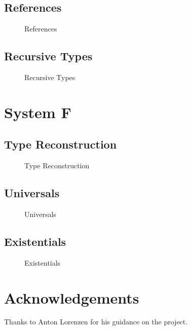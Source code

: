 \documentclass[nonacm]{acmart}
\begin{document}
\subsection{References}

\begin{figure}
  \begin{framed}
  \end{framed}
  \caption{References}\label{fig:references}
\end{figure}

\subsection{Recursive Types}

\begin{figure}
  \begin{framed}
  \end{framed}
  \caption{Recursive Types}\label{fig:recursive-types}
\end{figure}

\section{System F}

\subsection{Type Reconstruction}

\begin{figure}
  \begin{framed}
  \end{framed}
  \caption{Type Reconstruction}\label{fig:type-reconstruction}
\end{figure}

\subsection{Universals}

\begin{figure}
  \begin{framed}
  \end{framed}
  \caption{Universals}\label{fig:universals}
\end{figure}

\subsection{Existentials}

\begin{figure}
  \begin{framed}
  \end{framed}
  \caption{Existentials}\label{fig:existentials}
\end{figure}

\section{Acknowledgements}

Thanks to Anton Lorenzen for his guidance on the project.
\end{document}
